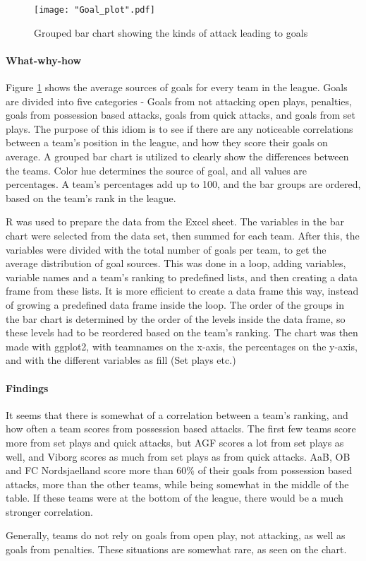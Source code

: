 \documentclass[Report.tex]{subfiles}
\begin{document}
\begin{figure}
\center
\texttt{[image: "Goal\_plot".pdf]}
\caption{Grouped bar chart showing the kinds of attack leading to goals}
\label{Fig:Goal_plot}
\end{figure}

\paragraph{What-why-how\\}
Figure \ref{Fig:Goal_plot} shows the average sources of goals for every team in the
league. Goals are divided into five categories - Goals from not attacking open
plays, penalties, goals from possession based attacks, goals from quick attacks,
and goals from set plays. 
The purpose of this idiom is to see if there are any noticeable correlations
between a team's position in the league, and how they score their goals on
average. 
A grouped bar chart is utilized to clearly show the differences between the
teams. Color hue determines the source of goal, and all values are
percentages. A team's percentages add up to 100, and the bar groups are ordered,
based on the team's rank in the league. 

R was used to prepare the data from the Excel sheet. The variables in the bar
chart were selected from the data set, then summed for each team. After this, the
variables were divided with the total number of goals per team, to get the
average distribution of goal sources. 
This was done in a loop, adding variables, variable names and a team's ranking
to predefined lists, and then creating a data frame from these lists. It is more
efficient to create a data frame this way, instead of growing a predefined data
frame inside the loop. 
The order of the groups in the bar chart is determined by the order of the
levels inside the data frame, so these levels had to be reordered based on the
team's ranking.
The chart was then made with ggplot2, with teamnames on the x-axis, the
percentages on the y-axis, and with the different variables as fill (Set plays
etc.)

\paragraph{Findings\\}
It seems that there is somewhat of a correlation between a team's ranking, and how often a team scores from possession based attacks. The first few teams score more from set plays and quick attacks, but AGF scores a lot from set plays as well, and Viborg scores as much from set plays as from quick attacks. AaB, OB and FC Nordsjaelland score more than 60\% of their goals from possession based attacks, more than the other teams, while being somewhat in the middle of the table. If these teams were at the bottom of the league, there would be a much stronger correlation. 

Generally, teams do not rely on goals from open play, not attacking, as well as goals from penalties. These situations are somewhat rare, as seen on the chart. 
\end{document}
